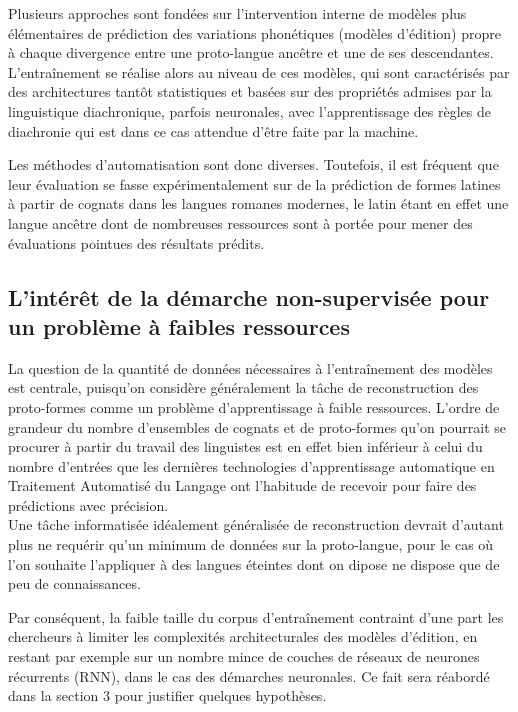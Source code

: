 \documentclass[10pt, french]{article}
\begin{document}
\begin{multicols*}{2}
Plusieurs approches sont fondées sur l'intervention interne de modèles plus élémentaires de prédiction 
des variations phonétiques (modèles d'édition) propre à chaque divergence entre une proto-langue ancêtre 
et une de ses descendantes. L'entraînement se réalise alors au niveau de ces modèles, qui sont caractérisés 
par des architectures tantôt statistiques et basées sur des propriétés admises par la linguistique 
diachronique\cite{bouchard}, parfois neuronales, avec l'apprentissage des règles de diachronie qui 
est dans ce cas attendue d'être faite par la machine\cite{andre}\cite{meloni}.

Les méthodes d'automatisation sont donc diverses. Toutefois, il est fréquent que leur évaluation 
se fasse expérimentalement sur de la prédiction de formes latines à partir de cognats dans les 
langues romanes modernes, le latin étant en effet une langue ancêtre dont de nombreuses ressources 
sont à portée pour mener des évaluations pointues des résultats prédits. \cite{andre}\cite{bouchard}\cite{meloni}

\subsection{L'intérêt de la démarche non-supervisée pour un problème à faibles ressources}
La question de la quantité de données nécessaires à l'entraînement des modèles est centrale, 
puisqu'on considère généralement la tâche de reconstruction des proto-formes comme un problème 
d'apprentissage à faible ressources. L'ordre de grandeur du nombre d'ensembles de cognats et 
de proto-formes qu'on pourrait se procurer à partir du travail des linguistes est en effet 
bien inférieur à celui du nombre d'entrées que les dernières technologies d'apprentissage 
automatique en Traitement Automatisé du Langage ont l'habitude de recevoir pour faire des 
prédictions avec précision.\cite{fourier}\\
Une tâche informatisée idéalement généralisée de reconstruction devrait d'autant plus ne 
requérir qu'un minimum de données sur la proto-langue, pour le cas où l'on souhaite l'appliquer 
à des langues éteintes dont on dipose ne dispose que de peu de connaissances.

Par conséquent, la faible taille du corpus d'entraînement contraint d'une part les chercheurs à 
limiter les complexités architecturales des modèles d'édition, en restant par exemple sur un 
nombre mince de couches de réseaux de neurones récurrents (RNN), dans le cas des 
démarches neuronales.\cite{andre}\cite{meloni} Ce fait sera réabordé dans la section 3 pour 
justifier quelques hypothèses.


\end{multicols*}
\end{document}
